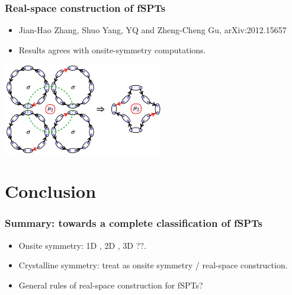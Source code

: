 \documentclass[xcolor=table, 11pt, aspectratio=1610]{beamer}
\begin{document}
\begin{frame}
  \frametitle{Real-space construction of fSPTs}

  \begin{itemize}
  \item Jian-Hao Zhang, Shuo Yang, YQ and Zheng-Cheng Gu, arXiv:2012.15657
  \item Results agrees with onsite-symmetry computations.
  \end{itemize}
  \begin{center}
    \includegraphics[height=4cm]{majorana_bubble}    
  \end{center}
\end{frame}

\section{Conclusion}

\begin{frame}
\frametitle{Summary: towards a complete classification of fSPTs}
\begin{itemize}
\item Onsite symmetry: 1D , 2D , 3D ??.
\item Crystalline symmetry: treat as onsite symmetry / real-space construction.
\item General rules of real-space construction for fSPTs?
\end{itemize}
\end{frame}
\end{document}
